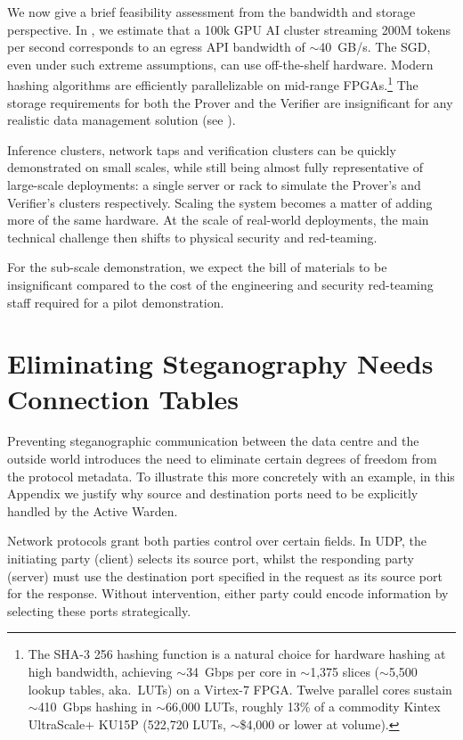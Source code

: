 \documentclass{article}
\begin{document}
We now give a brief feasibility assessment from the bandwidth and storage perspective. In , we estimate that a 100k GPU AI cluster streaming 200M tokens per second corresponds to an egress API bandwidth of $\sim$40~GB/s. The SGD, even under such extreme assumptions, can use off-the-shelf hardware. Modern hashing algorithms are efficiently parallelizable on mid-range FPGAs.\footnote{The SHA-3 256 hashing function is a natural choice for hardware hashing at high bandwidth, achieving $\sim$34~Gbps per core in $\sim$1,375 slices ($\sim$5,500 lookup tables, aka.\ LUTs) on a Virtex-7 FPGA. Twelve parallel cores sustain $\sim$410~Gbps hashing in $\sim$66,000 LUTs, roughly 13\% of a commodity Kintex UltraScale+ KU15P (522,720 LUTs, $\sim$\$4,000 or lower at volume).} The storage requirements for both the Prover and the Verifier are insignificant for any realistic data management solution (see ).

Inference clusters, network taps and verification clusters can be quickly demonstrated on small scales, while still being almost fully representative of large-scale deployments: a single server or rack to simulate the Prover's and Verifier's clusters respectively. Scaling the system becomes a matter of adding more of the same hardware. At the scale of real-world deployments, the main technical challenge then shifts to physical security and red-teaming.

For the sub-scale demonstration, we expect the bill of materials to be insignificant compared to the cost of the engineering and security red-teaming staff required for a pilot demonstration.

\section{Eliminating Steganography Needs Connection Tables}
\label{app:ports}

Preventing steganographic communication between the data centre and the outside world introduces the need to eliminate certain degrees of freedom from the protocol metadata. To illustrate this more concretely with an example, in this Appendix we justify why source and destination ports need to be explicitly handled by the Active Warden.

Network protocols grant both parties control over certain fields. In UDP, the initiating party (client) selects its source port, whilst the responding party (server) must use the destination port specified in the request as its source port for the response. Without intervention, either party could encode information by selecting these ports strategically.
\end{document}
